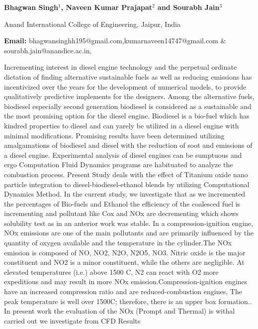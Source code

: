 \documentclass[twoside,11pt]{amsart}
\begin{document}
\centerline{\textbf{Bhagwan Singh$^{1}$, Naveen Kumar Prajapat$^{2}$ and Sourabh Jain$^{3}$}}
\vskip 2mm
\begin{flushleft}
Anand International College of Engineering, Jaipur, India
\vskip 2mm
\end{flushleft}
\vskip 2mm
\begin{flushleft}
{\bf Email:} bhagwansinghh195@gmail.com,kumarnaveen14747@gmail.com \& sourabh.jain@anandice.ac.in,
\end{flushleft}
\vskip 5mm
Incrementing interest in diesel engine technology and the perpetual ordinate dictation
of finding alternative sustainable fuels as well as reducing emissions has incentivized
over the years for the development of numerical models, to provide qualitatively
predictive implements for the designers. Among the alternative fuels, biodiesel
especially second generation biodiesel is considered as a sustainable and the most
promising option for the diesel engine.
Biodiesel is a bio-fuel which has kindred properties to diesel and can yarely be utilized
in a diesel engine with minimal modifications. Promising results have been determined
utilizing amalgamations of biodiesel and diesel with the reduction of soot and emissions
of a diesel engine. Experimental analysis of diesel engines can be sumptuous and ergo
Computation Fluid Dynamics programs are habituated to analyze the combustion
process. Present Study deals with the effect of Titanium oxide nano particle integration
to diesel-biodiesel-ethanol blends by utilizing Computational Dynamics Method. In the
current study, we investigate that as we incremented the percentages of Bio-fuels and
Ethanol the efficiency of the coalesced fuel is incrementing and pollutant like Cox and
NOx are decrementing which shows solubility test as in an anterior work was stable.
In a compression-ignition engine, NOx emissions are one of the main pollutants and are
primarily influenced by the quantity of oxygen available and the temperature in the
cylinder.The NOx emission is composed of NO, NO2, N2O, N2O5, NO3. Nitric oxide is the
major constituent and NO2 is a minor constituent, while the others are negligible. At
elevated temperatures (i.e.) above 1500 C, N2 can react with O2 more expeditious and
may result in more NOx emission.Compression-ignition engines have an increased
compression ratio and are reduced-combustion engines, The peak temperature is well
over 1500C; therefore, there is an upper box formation.. In present work the evaluation
of the NOx (Prompt and Thermal) is withal carried out we investigate from CFD Results
\end{document}
